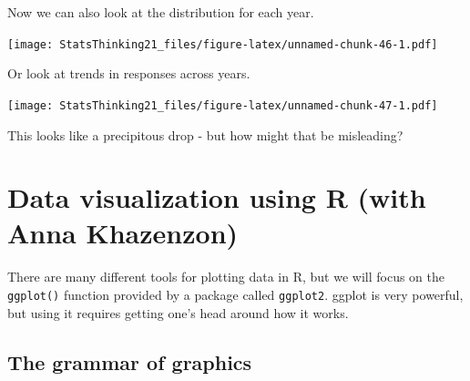 \documentclass[12pt,]{book}
\newenvironment{Shaded}{\begin{snugshade}}{\end{snugshade}}
\newcommand{\DataTypeTok}[1]{\textcolor[rgb]{0.13,0.29,0.53}{#1}}
\newcommand{\KeywordTok}[1]{\textcolor[rgb]{0.13,0.29,0.53}{\textbf{#1}}}
\newcommand{\NormalTok}[1]{#1}
\newcommand{\OperatorTok}[1]{\textcolor[rgb]{0.81,0.36,0.00}{\textbf{#1}}}
\newcommand{\StringTok}[1]{\textcolor[rgb]{0.31,0.60,0.02}{#1}}
\begin{document}
Now we can also look at the distribution for each year.

\begin{Shaded}
\end{Shaded}

\texttt{[image: StatsThinking21\_files/figure-latex/unnamed-chunk-46-1.pdf]}

Or look at trends in responses across years.

\begin{Shaded}
\end{Shaded}

\texttt{[image: StatsThinking21\_files/figure-latex/unnamed-chunk-47-1.pdf]}

This looks like a precipitous drop - but how might that be misleading?

\hypertarget{data-visualization-using-r-with-anna-khazenzon}{%
\chapter{Data visualization using R (with Anna Khazenzon)}\label{data-visualization-using-r-with-anna-khazenzon}}

There are many different tools for plotting data in R, but we will focus on the \texttt{ggplot()} function provided by a package called \texttt{ggplot2}. ggplot is very powerful, but using it requires getting one's head around how it works.

\hypertarget{the-grammar-of-graphics}{%
\section{The grammar of graphics}\label{the-grammar-of-graphics}}
\end{document}
